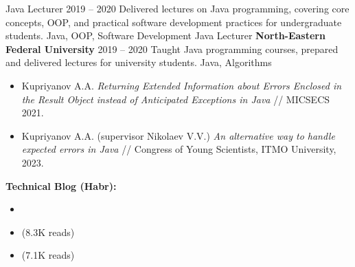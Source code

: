 \begin{education}
\end{education}
\vspace{0.3cm}

\begin{works}
    \work
        {Java Lecturer} {} {} {2019 -- 2020}
        {
            Delivered lectures on Java programming, covering core concepts, OOP, and practical software development practices for undergraduate students.
        }
        {Java, OOP, Software Development}
    \work
        {Java Lecturer} {\textbf{North-Eastern Federal University}} {} {2019 -- 2020}
        {
            Taught Java programming courses, prepared and delivered lectures for university students.
        }
        {Java, Algorithms}
\end{works}
\vspace{0.3cm}

\vspace{0.2cm}
\begin{itemize}
    \item {\small Kupriyanov A.A. \textit{Returning Extended Information about Errors Enclosed in the Result Object instead of Anticipated Exceptions in Java} // MICSECS 2021. }
    \item {\small Kupriyanov A.A. (supervisor Nikolaev V.V.) \textit{An alternative way to handle expected errors in Java} // Congress of Young Scientists, ITMO University, 2023. }
\end{itemize}
\vspace{0.2cm}
\textbf{Technical Blog (Habr):}
\begin{itemize}
    \item {\small {}}
    \item {\small {} (8.3K reads)}
    \item {\small {} (7.1K reads)}
\end{itemize}
